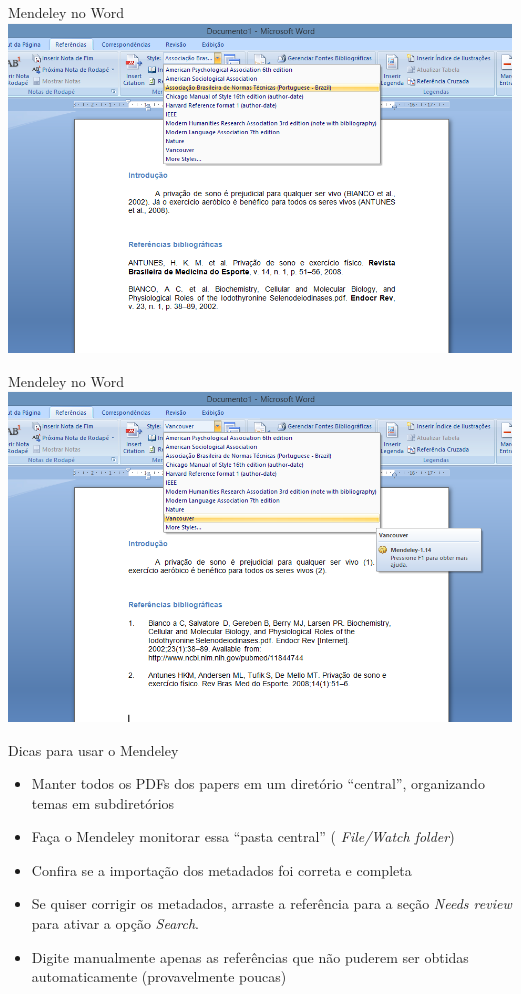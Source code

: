 \documentclass{beamer}
\begin{document}
\begin{frame}{Mendeley no Word}
  \centering
  \includegraphics[width=1.1\textwidth]{Referencias/mendeley-word-ABNT}
\end{frame}

\begin{frame}{Mendeley no Word}
  \centering
  \includegraphics[width=1.1\textwidth]{Referencias/mendeley-word-vancouver}
\end{frame}

\begin{frame}{Dicas para usar o Mendeley}
  \begin{itemize}
    \footnotesize
  \item Manter \alert{todos} os PDFs dos papers em um diretório
    ``central'', organizando temas em subdiretórios
  \item Faça o Mendeley \alert{monitorar} essa ``pasta central'' ({\em
      File/Watch folder})
  \item Confira se a importação dos metadados foi correta e completa
  \item Se quiser corrigir os metadados, arraste a referência para a
    seção {\em Needs review} para ativar a opção {\em Search}.
  \item Digite manualmente apenas as referências que não puderem ser
    obtidas automaticamente (provavelmente poucas)
  \end{itemize}
\end{frame}
\end{document}
